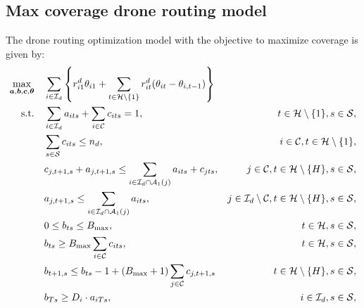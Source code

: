 \documentclass{article}
\newcommand{\set}[1]{\mathcal{#1}}
\begin{document}
\subsection{Max coverage drone routing model}\label{appendix:max coverage drones}
The drone routing optimization model with the objective to maximize coverage is given by:
\allowdisplaybreaks
\begin{subequations} \label{eq:maxcov}
    \begin{align}
        \max_{\bm a, \bm b, \bm c, \bm \theta}  &\quad \displaystyle \sum_{i \in \set I_d} \left\{r_{i1}^d \theta_{i1} + \sum_{t \in \set H \setminus \{1\}} r_{it}^d (\theta_{it} - \theta_{i,t-1}) \right\} \label{eq:maxcov_a}%
        \\ {\rm s.t. } 
        &\quad \displaystyle \sum_{i \in \set I_d} a_{its} + \sum_{i \in \set C} c_{its} = 1, & t \in \set H \setminus \{1\}, s \in \set S, \label{eq:maxcov_b}\\
        &\quad \displaystyle \sum_{s \in \set S} c_{its} \leq n_d, & i \in \set C, t \in \set H \setminus \{1\}, \label{eq:maxcov_c}\\
        &\quad \displaystyle c_{j,t+1,s} + a_{j,t+1,s} \leq \sum_{i \in \set I_d \cap \set A_1(j)} a_{its} + c_{jts}, &  j \in \set C, t \in \set H \setminus \{H\}, s \in \set S, \label{eq:maxcov_d}\\
        &\quad \displaystyle a_{j,t+1,s} \leq \sum_{i \in \set I_d \cap \set A_1(j)} a_{its}, &  j \in \set I_d \setminus \set C, t \in \set H \setminus \{H\}, s \in \set S, \label{eq:maxcov_e}\\
        &\quad \displaystyle 0 \leq b_{ts} \leq B_{\text{max}}, & t \in \set H, s \in \set S, \label{eq:maxcov_f}\\
        &\quad \displaystyle b_{ts} \geq B_{\text{max}} \sum_{i \in \set C} c_{its}, & t \in \set H, s \in \set S, \label{eq:maxcov_g}\\
        &\quad \displaystyle b_{t+1,s} \leq b_{ts} - 1 + (B_{\text{max}} + 1) \sum_{j \in \set C} c_{j,t+1,s} & t \in \set H \setminus \{H\}, s \in \set S, \label{eq:maxcov_h}\\
        &\quad \displaystyle b_{Ts} \geq D_i \cdot a_{iTs}, & i \in \set I_d, s \in \set S, \label{eq:maxcov_i}\\

\end{align}
\end{subequations}
\end{document}

